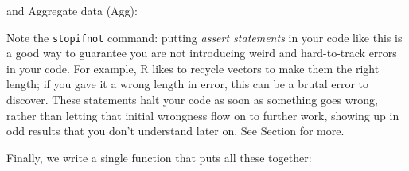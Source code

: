 \documentclass[
]{book}
\newenvironment{Shaded}{\begin{snugshade}}{\end{snugshade}}
\newcommand{\AttributeTok}[1]{\textcolor[rgb]{0.77,0.63,0.00}{#1}}
\newcommand{\ControlFlowTok}[1]{\textcolor[rgb]{0.13,0.29,0.53}{\textbf{#1}}}
\newcommand{\DecValTok}[1]{\textcolor[rgb]{0.00,0.00,0.81}{#1}}
\newcommand{\FunctionTok}[1]{\textcolor[rgb]{0.00,0.00,0.00}{#1}}
\newcommand{\NormalTok}[1]{#1}
\newcommand{\OtherTok}[1]{\textcolor[rgb]{0.56,0.35,0.01}{#1}}
\newcommand{\SpecialCharTok}[1]{\textcolor[rgb]{0.00,0.00,0.00}{#1}}
\newcommand{\StringTok}[1]{\textcolor[rgb]{0.31,0.60,0.02}{#1}}
\begin{document}
and Aggregate data (Agg):

\begin{Shaded}
\end{Shaded}

Note the \texttt{stopifnot} command: putting \emph{assert statements} in your code like this is a good way to guarantee you are not introducing weird and hard-to-track errors in your code.
For example, R likes to recycle vectors to make them the right length; if you gave it a wrong length in error, this can be a brutal error to discover.
These statements halt your code as soon as something goes wrong, rather than letting that initial wrongness flow on to further work, showing up in odd results that you don't understand later on.
See Section \citet{about_stopifnot} for more.

Finally, we write a single function that puts all these together:
\end{document}
